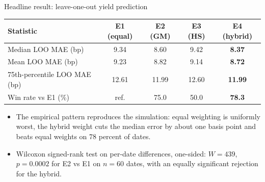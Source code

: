 \documentclass[aspectratio=169,11pt]{beamer}
\begin{document}
\begin{frame}{Headline result: leave-one-out yield prediction}
  \begin{center}
  \small
  \begin{tabular}{lcccc}
  \toprule
  Statistic & E1 (equal) & E2 (GM) & E3 (HS) & E4 (hybrid) \\
  \midrule
  Median LOO MAE (bp)          & 9.34 & 8.60 & 9.42 & \textbf{8.37} \\
  Mean LOO MAE (bp)            & 9.23 & 8.82 & 9.14 & \textbf{8.72} \\
  75th-percentile LOO MAE (bp) & 12.61 & 11.99 & 12.60 & \textbf{11.99} \\
  Win rate vs E1 (\%)          & ref. & 75.0 & 50.0 & \textbf{78.3} \\
  \bottomrule
  \end{tabular}
  \end{center}
  \vspace{2mm}
  \begin{itemize}
    \item The empirical pattern reproduces the simulation: equal weighting is
          uniformly worst, the hybrid weight cuts the median error by about
          one basis point and beats equal weights on 78 percent of dates.
    \item Wilcoxon signed-rank test on per-date differences, one-sided:
          $W = 439$, $p = 0.0002$ for E2 vs E1 on $n = 60$ dates, with an
          equally significant rejection for the hybrid.
  \end{itemize}
\end{frame}
\end{document}
